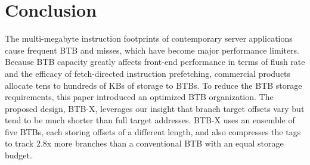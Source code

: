 \section{Conclusion}
\label{cal:sec:conclusion}

The multi-megabyte instruction footprints of contemporary server applications cause frequent BTB and  misses, which have become major performance limiters. Because BTB capacity greatly affects front-end performance in terms of flush rate and the efficacy of fetch-directed instruction prefetching, commercial products allocate tens to hundreds of KBs of storage to BTBs. To reduce the BTB storage requirements, this paper introduced an optimized BTB organization. The proposed design, BTB-X, leverages our insight that branch target offsets vary but tend to be much shorter than full target addresses. BTB-X uses an ensemble of five BTBs, each storing offsets of a different length, and also compresses the tags to track  2.8x more branches than a conventional BTB with an equal storage budget.
